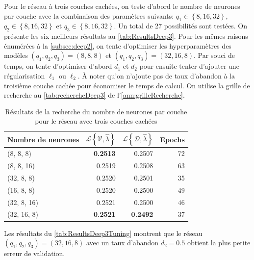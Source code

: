 Pour le réseau à trois couches cachées, on teste d'abord le nombre de neurones par couche avec la combinaison des paramètres suivants: $q_1\in \left\{8, 16, 32 \right\}$, $q_2 \in \left\{8, 16, 32 \right\}$ et $q_3\in \left\{8, 16, 32 \right\}$. Un total de 27 possibilités sont testées. On présente les six meilleurs résultats au \autoref{tab:ResultsDeep3}. Pour les mêmes raisons énumérées à la \autoref{subsec:deep2}, on tente d'optimiser les hyperparamètres des modèles $(q_1,q_2,q_3) = (8,8,8)$ et $(q_1,q_2,q_3) = (32,16,8)$. 
Par souci de temps, on tente d'optimiser d'abord $d_1$ et $d_2$ pour ensuite tenter d'ajouter une régularisation $\ell_1$ ou $\ell_2$. À noter qu'on n'ajoute pas de taux d'abandon à la troisième couche cachée pour économiser le temps de calcul. On utilise la grille de recherche au \autoref{tab:rechercheDeep3} de l'\autoref{ann:grilleRecherche}. 

\begin{table}[b]
\centering
\caption{\label{tab:ResultsDeep3} Résultats de la recherche du nombre de neurones par couche pour le réseau avec trois couches cachées}
\begin{tabularx}{0.6\textwidth}{Xrrr}
\toprule
Nombre \newline de neurones & $\mathcal{L}\left\{\mathcal{V},\hat{\lambda} \right\} $ & $\mathcal{L}\left\{\mathcal{D},\hat{\lambda} \right\} $ & Epochs\\
\midrule
(8, 8, 8) & \textbf{0.2513} & 0.2507 & 72\\
(8, 8, 16) & 0.2519 & 0.2508 & 63\\
(32, 8, 8) & 0.2520 & 0.2501 & 35\\
(16, 8, 8) & 0.2520 & 0.2500 & 49\\
(32, 8, 16) & 0.2521 & 0.2500 & 46\\
\addlinespace
(32, 16, 8) & \textbf{0.2521} & \textbf{0.2492} & 37\\
\bottomrule
\end{tabularx}
\end{table}

Les résultats du \autoref{tab:ResultsDeep3Tuning} montrent que le réseau $(q_1,q_2,q_3)=(32,16,8)$ avec un taux d'abandon $d_2=0.5$ obtient la plus petite erreur de validation. 

